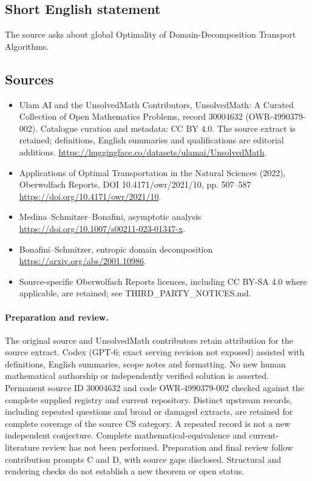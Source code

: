 \documentclass[11pt]{article}
\begin{document}
\subsection{Short English statement}
The source asks about global Optimality of Domain-Decomposition Transport Algorithms.
\subsection{Sources}
\begin{itemize}
\item[\hypertarget{source:30004632:1}{S1}] Ulam AI and the UnsolvedMath Contributors, UnsolvedMath: A Curated Collection of Open Mathematics Problems, record 30004632 (OWR-4990379-002). Catalogue curation and metadata: CC BY 4.0. The source extract is retained; definitions, English summaries and qualifications are editorial additions.
\url{https://huggingface.co/datasets/ulamai/UnsolvedMath}.
\item[\hypertarget{source:30004632:2}{S2}] Applications of Optimal Transportation in the Natural Sciences (2022), Oberwolfach Reports, DOI 10.4171/owr/2021/10, pp. 507--587
\url{https://doi.org/10.4171/owr/2021/10}.
\item[\hypertarget{source:30004632:3}{S3}] Medina--Schmitzer--Bonafini, asymptotic analysis
\url{https://doi.org/10.1007/s00211-023-01347-x}.
\item[\hypertarget{source:30004632:4}{S4}] Bonafini--Schmitzer, entropic domain decomposition
\url{https://arxiv.org/abs/2001.10986}.
\item Source-specific Oberwolfach Reports licences, including CC BY-SA 4.0 where applicable, are retained; see THIRD\_PARTY\_NOTICES.md.
\end{itemize}
\paragraph{Preparation and review.}
The original source and UnsolvedMath contributors retain attribution for the source extract. Codex (GPT-6; exact serving revision not exposed) assisted with definitions, English summaries, scope notes and formatting. No new human mathematical authorship or independently verified solution is asserted. Permanent source ID 30004632 and code OWR-4990379-002 checked against the complete supplied registry and current repository. Distinct upstream records, including repeated questions and broad or damaged extracts, are retained for complete coverage of the source CS category. A repeated record is not a new independent conjecture. Complete mathematical-equivalence and current-literature review has not been performed. Preparation and final review follow contribution prompts C and D, with source gaps disclosed. Structural and rendering checks do not establish a new theorem or open status.
\label{end:30004632}
\end{document}
